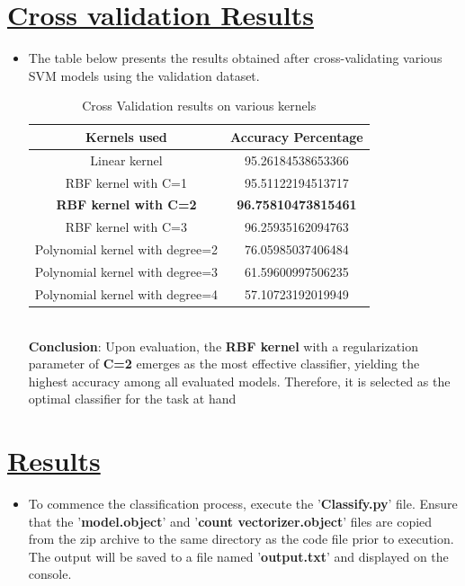 \documentclass[12pt, a4paper]{article}
\newcommand{\ulsection}[1]{\texorpdfstring{\uline{#1}}{#1}}
\begin{document}
\section{\ulsection{Cross validation Results}}
\begin{itemize}
    \item \large The table below presents the results obtained after cross-validating various SVM models using the validation dataset.
    \begin{table}[ht]
        \centering
        \begin{tabular}{|c|c|}
            \hline
            \rowcolor{blue!20} %
            \textbf{Kernels used} & \textbf{Accuracy Percentage} \\
            \hline
            Linear kernel & 95.26184538653366 \\
            \hline
            RBF kernel with C=1 & 95.51122194513717 \\
            \hline
            \textbf{RBF kernel with C=2} &\textbf{96.75810473815461}\\
            \hline
            RBF kernel with C=3&96.25935162094763\\
            \hline
            Polynomial kernel with degree=2&76.05985037406484 \\
            \hline
            Polynomial kernel with degree=3 &61.59600997506235\\
            \hline
            Polynomial kernel with degree=4&57.10723192019949\\
            \hline
        \end{tabular}
        \caption{\large Cross Validation results on various kernels}
        \label{tab:colored_table_lines}
    \end{table}\\
    \newline
    \newline
    \textbf{Conclusion}: Upon evaluation, the \textbf{RBF kernel} with a regularization parameter of \textbf{C=2} emerges as the most effective classifier, yielding the highest accuracy among all evaluated models. Therefore, it is selected as the optimal classifier for the task at hand
\end{itemize}
\section{\ulsection{Results}}
\begin{itemize}
    \hfuzz=100pt \item \large To commence the classification process, execute the '\textbf{Classify.py}' file. Ensure that the '\textbf{model.object}' and '\textbf{count \textunderscore vectorizer.object}' files are copied from the zip archive to the same directory as the code file prior to execution. The output will be saved to a file named '\textbf{output.txt}' and displayed on the console.
\end{itemize}
\end{document}

